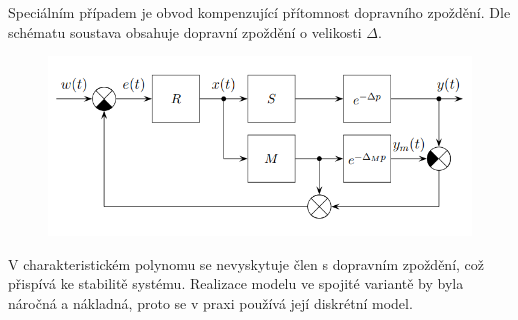 Speciálním případem je obvod kompenzující přítomnost dopravního zpoždění. Dle schématu soustava obsahuje dopravní zpoždění o velikosti $\Delta$.
\begin{figure}[H]
    \includegraphics*[scale = 1]{images/pomocneDP.png}
\end{figure}
V charakteristickém polynomu se nevyskytuje člen s dopravním zpoždění, což přispívá ke stabilitě systému. Realizace modelu ve spojité variantě by byla náročná a nákladná, proto se v praxi používá její diskrétní model.
